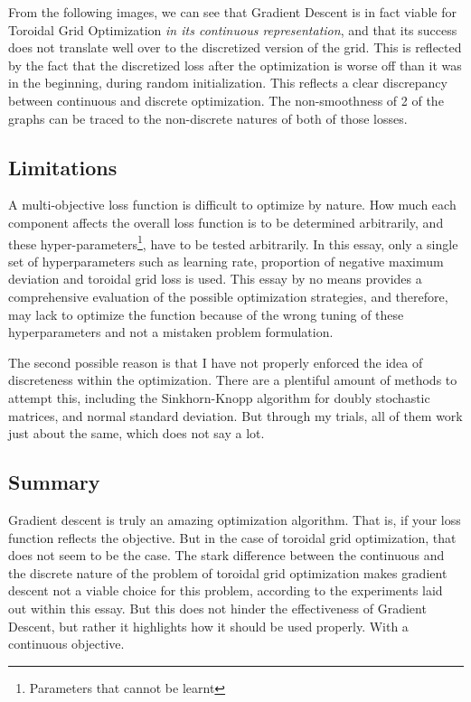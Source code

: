 From the following images, we can see that Gradient Descent is in fact viable for Toroidal Grid Optimization \emph{in its continuous representation}, and that its success does not translate well over to the discretized version of the grid. This is reflected by the fact that the discretized loss after the optimization is worse off than it was in the beginning, during random initialization. This reflects a clear discrepancy between continuous and discrete optimization. The non-smoothness of 2 of the graphs can be traced to the non-discrete natures of both of those losses.

\subsection{Limitations}%
\label{sub:limitations}
A multi-objective loss function is difficult to optimize by nature. How much each component affects the overall loss function is to be determined arbitrarily, and these hyper-parameters\footnote{Parameters that cannot be learnt}, have to be tested arbitrarily. In this essay, only a single set of hyperparameters such as learning rate, proportion of negative maximum deviation and toroidal grid loss is used. This essay by no means provides a comprehensive evaluation of the possible optimization strategies, and therefore, may lack to optimize the function because of the wrong tuning of these hyperparameters and not a mistaken problem formulation.

The second possible reason is that I have not properly enforced the idea of discreteness within the optimization. There are a plentiful amount of methods to attempt this, including the Sinkhorn-Knopp algorithm for doubly stochastic matrices, and normal standard deviation. But through my trials, all of them work just about the same, which does not say a lot.

\subsection{Summary}%
\label{sub:summary}
Gradient descent is truly an amazing optimization algorithm. That is, if your loss function reflects the objective. But in the case of toroidal grid optimization, that does not seem to be the case. The stark difference between the continuous and the discrete nature of the problem of toroidal grid optimization makes gradient descent not a viable choice for this problem, according to the experiments laid out within this essay. But this does not hinder the effectiveness of Gradient Descent, but rather it highlights how it should be used properly. With a continuous objective.


